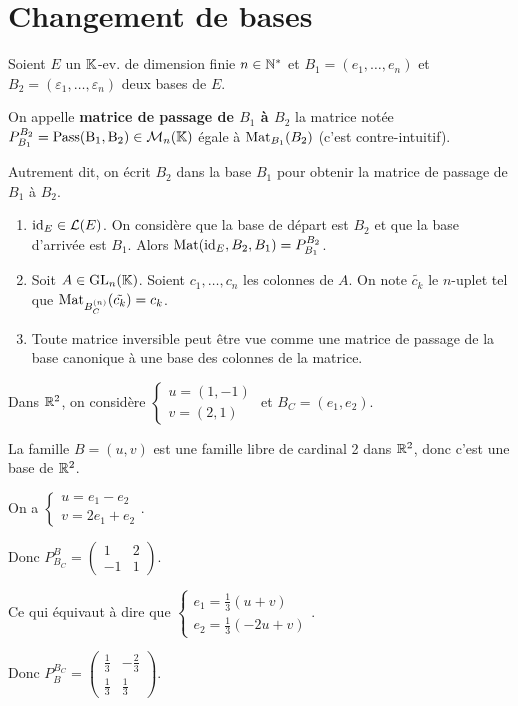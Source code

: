\documentclass[12pt, a4paper]{report}
\begin{document}
\chapter{Changement de bases}

\begin{definition}
    Soient $E$ un $\mathbb{K}$-ev. de dimension finie $n \in \mathbb{N}^*$ et $B_1 = (e_1,\dots,e_n)$ et $B_2 = (\varepsilon_1,\dots,\varepsilon_n)$ deux bases de $E$.

    On appelle \textbf{matrice de passage de $B_1$ à $B_2$} la matrice notée $P_{B_1}^{B_2} = \mathrm{Pass(B_1,B_2)} \in \mathcal M_n(\mathbb{K})$ égale à $\mathrm{Mat}_{B_1}(B_2)$ (c'est contre-intuitif).
    
    Autrement dit, on écrit $B_2$ dans la base $B_1$ pour obtenir la matrice de passage de $B_1$ à $B_2$.
\end{definition}

\begin{remark}
    \begin{enumerate}
        \item $\mathrm{id}_E \in \mathcal L(E)$. On considère que la base de départ est $B_2$ et que la base d'arrivée est $B_1$. Alors $\mathrm{Mat}(\mathrm{id}_E, B_2, B_1) = P_{B_1}^{B_2}$.
        \item Soit $A \in \mathrm{GL}_n(\mathbb{K})$. Soient $c_1,\dots,c_n$ les colonnes de $A$. On note $\tilde{c_k}$ le $n$-uplet tel que $\mathrm{Mat}_{B_C^{(n)}}(\tilde{c_k}) = c_k$.
        \item Toute matrice inversible peut être vue comme une matrice de passage de la base canonique à une base des colonnes de la matrice.
    \end{enumerate}
\end{remark}

\begin{example}
    Dans $\mathbb{R}^2$, on considère $\begin{cases} u = (1,-1) \\ v = (2,1) \end{cases}$ et $B_C = (e_1,e_2)$.

    La famille $B = (u,v)$ est une famille libre de cardinal 2 dans $\mathbb{R}^2$, donc c'est une base de $\mathbb{R}^2$.

    On a $\begin{cases} u = e_1 - e_2 \\ v = 2e_1 + e_2 \end{cases}$.

    Donc $P_{B_C}^B = \left(\begin{matrix} 1 & 2 \\ -1 & 1 \end{matrix}\right)$.

    Ce qui équivaut à dire que $\begin{cases} e_1 = \frac13 (u+v) \\ e_2 = \frac13 (-2u+v) \end{cases}$.

    Donc $P_B^{B_C} = \left(\begin{matrix} \frac13 & -\frac23 \\ \frac13 & \frac13 \end{matrix}\right)$.
\end{example}
\end{document}
